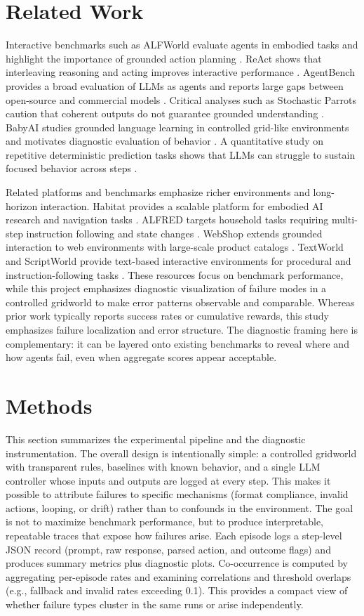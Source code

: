 \documentclass[conference]{IEEEtran}
\begin{document}
\section{Related Work}
Interactive benchmarks such as ALFWorld evaluate agents in embodied tasks and highlight the importance of grounded action planning \cite{alfworld}. ReAct shows that interleaving reasoning and acting improves interactive performance \cite{react}. AgentBench provides a broad evaluation of LLMs as agents and reports large gaps between open-source and commercial models \cite{agentbench}. Critical analyses such as Stochastic Parrots caution that coherent outputs do not guarantee grounded understanding \cite{stochasticparrots}. BabyAI studies grounded language learning in controlled grid-like environments and motivates diagnostic evaluation of behavior \cite{babyai}. A quantitative study on repetitive deterministic prediction tasks shows that LLMs can struggle to sustain focused behavior across steps \cite{quantstudy}.

Related platforms and benchmarks emphasize richer environments and long-horizon interaction. Habitat provides a scalable platform for embodied AI research and navigation tasks \cite{habitat}. ALFRED targets household tasks requiring multi-step instruction following and state changes \cite{alfred}. WebShop extends grounded interaction to web environments with large-scale product catalogs \cite{webshop}. TextWorld and ScriptWorld provide text-based interactive environments for procedural and instruction-following tasks \cite{textworld,scriptworld}. These resources focus on benchmark performance, while this project emphasizes diagnostic visualization of failure modes in a controlled gridworld to make error patterns observable and comparable.
Whereas prior work typically reports success rates or cumulative rewards, this study emphasizes failure localization and error structure. The diagnostic framing here is complementary: it can be layered onto existing benchmarks to reveal where and how agents fail, even when aggregate scores appear acceptable.

\section{Methods}
This section summarizes the experimental pipeline and the diagnostic instrumentation. The overall design is intentionally simple: a controlled gridworld with transparent rules, baselines with known behavior, and a single LLM controller whose inputs and outputs are logged at every step. This makes it possible to attribute failures to specific mechanisms (format compliance, invalid actions, looping, or drift) rather than to confounds in the environment. The goal is not to maximize benchmark performance, but to produce interpretable, repeatable traces that expose how failures arise.
Each episode logs a step-level JSON record (prompt, raw response, parsed action, and outcome flags) and produces summary metrics plus diagnostic plots. Co-occurrence is computed by aggregating per-episode rates and examining correlations and threshold overlaps (e.g., fallback and invalid rates exceeding 0.1). This provides a compact view of whether failure types cluster in the same runs or arise independently.
\end{document}

